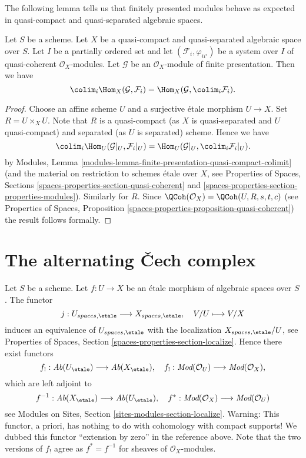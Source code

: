 \noindent
The following lemma tells us that finitely presented modules behave
as expected in quasi-compact and quasi-separated algebraic spaces.

\begin{lemma}
\label{lemma-finite-presentation-quasi-compact-colimit}
Let $S$ be a scheme. Let $X$ be a quasi-compact and quasi-separated
algebraic space over $S$. Let $I$ be a partially ordered set and
let $(\mathcal{F}_i, \varphi_{ii'})$ be a system over $I$
of quasi-coherent $\mathcal{O}_X$-modules. Let $\mathcal{G}$ be an
$\mathcal{O}_X$-module of finite presentation. Then we have
$$
\colim_i \Hom_X(\mathcal{G}, \mathcal{F}_i)
=
\Hom_X(\mathcal{G}, \colim_i \mathcal{F}_i).
$$
\end{lemma}

\begin{proof}
Choose an affine scheme $U$ and a surjective \'etale morphism
$U \to X$. Set $R = U \times_X U$. Note that $R$ is a quasi-compact
(as $X$ is quasi-separated and $U$ quasi-compact) and separated (as
$U$ is separated) scheme. Hence we have
$$
\colim_i \Hom_U(\mathcal{G}|_U, \mathcal{F}_i|_U)
=
\Hom_U(\mathcal{G}|_U, \colim_i \mathcal{F}_i|_U).
$$
by Modules, Lemma \ref{modules-lemma-finite-presentation-quasi-compact-colimit}
(and the material on restriction to
schemes \'etale over $X$, see
Properties of Spaces, Sections \ref{spaces-properties-section-quasi-coherent}
and \ref{spaces-properties-section-properties-modules}). Similarly for $R$.
Since $\QCoh(\mathcal{O}_X) = \QCoh(U, R, s, t, c)$ (see
Properties of Spaces, Proposition
\ref{spaces-properties-proposition-quasi-coherent})
the result follows formally.
\end{proof}




\section{The alternating {\v C}ech complex}
\label{section-alternating-cech}

\noindent
Let $S$ be a scheme. Let $f : U \to X$ be an \'etale morphism of algebraic
spaces over $S$. The functor
$$
j : U_{spaces, \etale} \longrightarrow X_{spaces, \etale},\quad
V/U \longmapsto V/X
$$
induces an equivalence of $U_{spaces, \etale}$ with the localization
$X_{spaces, \etale}/U$, see
Properties of Spaces, Section \ref{spaces-properties-section-localize}.
Hence there exist functors
$$
f_! : \textit{Ab}(U_\etale) \longrightarrow
\textit{Ab}(X_\etale),\quad
f_! : \textit{Mod}(\mathcal{O}_U) \longrightarrow \textit{Mod}(\mathcal{O}_X),
$$
which are left adjoint to
$$
f^{-1} : \textit{Ab}(X_\etale) \longrightarrow
\textit{Ab}(U_\etale),\quad
f^* : \textit{Mod}(\mathcal{O}_X) \longrightarrow \textit{Mod}(\mathcal{O}_U)
$$
see
Modules on Sites, Section \ref{sites-modules-section-localize}.
Warning: This functor, a priori, has
nothing to do with cohomology with compact supports!
We dubbed this functor ``extension by zero'' in the reference above.
Note that the two versions of $f_!$ agree as $f^* = f^{-1}$ for
sheaves of $\mathcal{O}_X$-modules.

